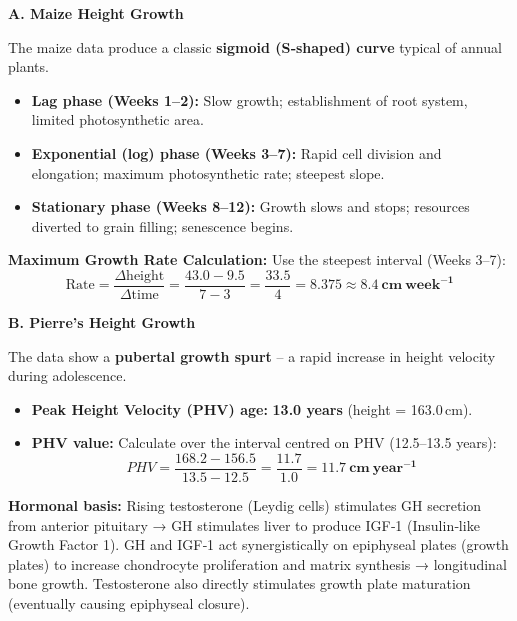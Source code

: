 \documentclass[11pt]{article}
\newcommand{\cle}[1]{{\popxbold\color{popdark}#1}}
\begin{document}
\begin{exemplebox}
\textbf{A. Maize Height Growth}
\begin{aretenir}
The maize data produce a classic \textbf{sigmoid (S‑shaped) curve} typical of annual plants.
\begin{itemize}
    \item \textbf{Lag phase (Weeks 1–2):} Slow growth; establishment of root system, limited photosynthetic area.
    \item \textbf{Exponential (log) phase (Weeks 3–7):} Rapid cell division and elongation; maximum photosynthetic rate; steepest slope.
    \item \textbf{Stationary phase (Weeks 8–12):} Growth slows and stops; resources diverted to grain filling; senescence begins.
\end{itemize}
\textbf{Maximum Growth Rate Calculation:}
Use the steepest interval (Weeks 3–7):
\[
\text{Rate} = \frac{\Delta \text{height}}{\Delta \text{time}} = \frac{43.0 - 9.5}{7 - 3} = \frac{33.5}{4} = 8.375 \approx \mathbf{8.4\ cm\ week^{-1}}
\]
\end{aretenir}

\textbf{B. Pierre’s Height Growth}
\begin{aretenir}
The data show a \textbf{pubertal growth spurt} – a rapid increase in height velocity during adolescence.
\begin{itemize}
    \item \textbf{Peak Height Velocity (PHV) age:} \textbf{13.0 years} (height = 163.0 cm).
    \item \textbf{PHV value:} Calculate over the interval centred on PHV (12.5–13.5 years):
    \[
    PHV = \frac{168.2 - 156.5}{13.5 - 12.5} = \frac{11.7}{1.0} = \mathbf{11.7\ cm\ year^{-1}}
    \]
\end{itemize}
\textbf{Hormonal basis:} Rising \cle{testosterone} (Leydig cells) stimulates \cle{GH} secretion from anterior pituitary → GH stimulates liver to produce \cle{IGF‑1} (Insulin‑like Growth Factor 1). GH and IGF‑1 act synergistically on \cle{epiphyseal plates} (growth plates) to increase chondrocyte proliferation and matrix synthesis → longitudinal bone growth. Testosterone also directly stimulates growth plate maturation (eventually causing epiphyseal closure).
\end{aretenir}
\end{exemplebox}
\end{document}

